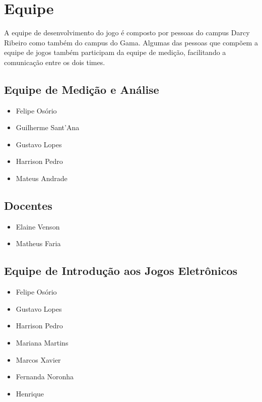 \chapter{Equipe}
	A equipe de desenvolvimento do jogo é composto por pessoas do campus Darcy Ribeiro como também do campus do Gama. Algumas das pessoas que compõem a equipe de jogos também participam da equipe de medição, facilitando a comunicação entre os dois times.

\section{Equipe de Medição e Análise}
	\begin{itemize}
		\item Felipe Osório
		\item Guilherme Sant'Ana
		\item Gustavo Lopes
		\item Harrison Pedro
		\item Mateus Andrade
	\end{itemize}

\section{Docentes}
	\begin{itemize}
		\item Elaine Venson
		\item Matheus Faria
	\end{itemize}

\section{Equipe de Introdução aos Jogos Eletrônicos}
	\begin{itemize}
		\item Felipe Osório
		\item Gustavo Lopes
		\item Harrison Pedro
		\item Mariana Martins
		\item Marcos Xavier
		\item Fernanda Noronha
		\item Henrique
	\end{itemize}